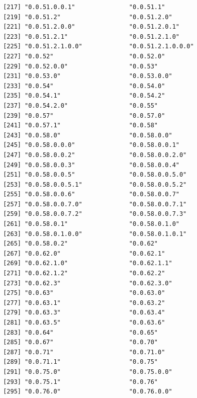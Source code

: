 \documentclass[
  letterpaper,
  DIV=11,
  numbers=noendperiod]{scrreprt}
\begin{document}
\begin{verbatim}
 [217] "0.0.51.0.0.1"               "0.0.51.1"                  
 [219] "0.0.51.2"                   "0.0.51.2.0"                
 [221] "0.0.51.2.0.0"               "0.0.51.2.0.1"              
 [223] "0.0.51.2.1"                 "0.0.51.2.1.0"              
 [225] "0.0.51.2.1.0.0"             "0.0.51.2.1.0.0.0"          
 [227] "0.0.52"                     "0.0.52.0"                  
 [229] "0.0.52.0.0"                 "0.0.53"                    
 [231] "0.0.53.0"                   "0.0.53.0.0"                
 [233] "0.0.54"                     "0.0.54.0"                  
 [235] "0.0.54.1"                   "0.0.54.2"                  
 [237] "0.0.54.2.0"                 "0.0.55"                    
 [239] "0.0.57"                     "0.0.57.0"                  
 [241] "0.0.57.1"                   "0.0.58"                    
 [243] "0.0.58.0"                   "0.0.58.0.0"                
 [245] "0.0.58.0.0.0"               "0.0.58.0.0.1"              
 [247] "0.0.58.0.0.2"               "0.0.58.0.0.2.0"            
 [249] "0.0.58.0.0.3"               "0.0.58.0.0.4"              
 [251] "0.0.58.0.0.5"               "0.0.58.0.0.5.0"            
 [253] "0.0.58.0.0.5.1"             "0.0.58.0.0.5.2"            
 [255] "0.0.58.0.0.6"               "0.0.58.0.0.7"              
 [257] "0.0.58.0.0.7.0"             "0.0.58.0.0.7.1"            
 [259] "0.0.58.0.0.7.2"             "0.0.58.0.0.7.3"            
 [261] "0.0.58.0.1"                 "0.0.58.0.1.0"              
 [263] "0.0.58.0.1.0.0"             "0.0.58.0.1.0.1"            
 [265] "0.0.58.0.2"                 "0.0.62"                    
 [267] "0.0.62.0"                   "0.0.62.1"                  
 [269] "0.0.62.1.0"                 "0.0.62.1.1"                
 [271] "0.0.62.1.2"                 "0.0.62.2"                  
 [273] "0.0.62.3"                   "0.0.62.3.0"                
 [275] "0.0.63"                     "0.0.63.0"                  
 [277] "0.0.63.1"                   "0.0.63.2"                  
 [279] "0.0.63.3"                   "0.0.63.4"                  
 [281] "0.0.63.5"                   "0.0.63.6"                  
 [283] "0.0.64"                     "0.0.65"                    
 [285] "0.0.67"                     "0.0.70"                    
 [287] "0.0.71"                     "0.0.71.0"                  
 [289] "0.0.71.1"                   "0.0.75"                    
 [291] "0.0.75.0"                   "0.0.75.0.0"                
 [293] "0.0.75.1"                   "0.0.76"                    
 [295] "0.0.76.0"                   "0.0.76.0.0"                

\end{verbatim}
\end{document}
